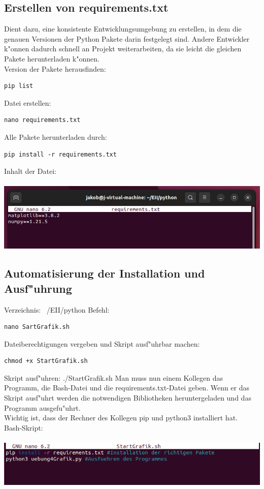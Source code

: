 \documentclass[a4paper,11pt,titlepage]{article}
\begin{document}
\subsection{Erstellen von requirements.txt}
Dient dazu, eine konsistente Entwicklungsumgebung zu erstellen, in dem die genauen Versionen der Python Pakete darin festgelegt sind.
Andere Entwickler k"onnen dadurch schnell an Projekt weiterarbeiten, da sie leicht die gleichen Pakete herunterladen k"onnen.\\
Version der Pakete herausfinden: 
\begin{verbatim}pip list\end{verbatim}
Datei erstellen: 
\begin{verbatim}nano requirements.txt\end{verbatim}
Alle Pakete herunterladen durch: 
\begin{verbatim}pip install -r requirements.txt\end{verbatim}
Inhalt der Datei:\\
\\
\includegraphics [width = 15 cm] {requirements.png}
\subsection{Automatisierung der Installation und Ausf"uhrung}
Verzeichnis: ~/EII/python
Befehl: 
\begin{verbatim}nano SartGrafik.sh\end{verbatim}
Dateiberechtigungen vergeben und Skript ausf"uhrbar machen: 
\begin{verbatim}chmod +x StartGrafik.sh\end{verbatim}
Skript ausf"uhren: ./StartGrafik.sh
Man muss nun einem Kollegen das Programm, die Bash-Datei und die requirements.txt-Datei geben. Wenn er das Skript ausf"uhrt werden die notwendigen Bibliotheken heruntergeladen und das Programm ausgefu"uhrt.\\
Wichtig ist, dass der Rechner des Kollegen pip und python3 installiert hat.\\
Bash-Skript:\\
\\
\includegraphics [width = 15 cm] {Bash-Skript.png}\\
\end{document}
